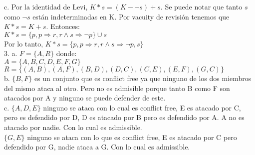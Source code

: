 c. Por la identidad de Levi, $K*s = (K - \neg s) + s$. Se puede notar que tanto $s$ como $\neg s$ están indeterminadas en K. Por vacuity de revisión tenemos que $K*s = K+s$. Entonces: \\

$K*s = \{p, p \Longrightarrow r , r \land s \Longrightarrow \neg p \} \cup {s} $\\

Por lo tanto, $K*s = \{p, p \Longrightarrow r , r \land s \Longrightarrow \neg p, s \}$ \\

3. a. $F=\{A, R\}$ donde: \\
$A=\{A, B, C, D, E, F, G\}$ \\
$R=\{(A, B), (A, F), (B, D), (D, C), (C, E), (E, F), (G, C)\}$ \\

b. $\{B, F\}$ es un conjunto que es conflict free ya que ninguno de los dos miembros del mismo ataca al otro. Pero no es admisible porque tanto B como F son atacados por A y ninguno se puede defender de este.\\

c. $\{A, D, E\}$ ninguno se ataca con lo cual es conflict free, E es atacado por C, pero es defendido por D, D es atacado por B pero es defendido por A. A no es atacado por nadie. Con lo cual es admissible. \\

$\{G, E\}$ ninguno se ataca con lo que es conflict free, E es atacado por C pero defendido por G, nadie ataca a G. Con lo cual es admissible.

\bigskip